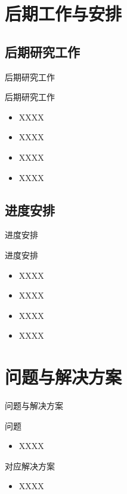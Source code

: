 \documentclass[9pt]{ctexbeamer}
\begin{document}
\section{后期工作与安排}

\subsection{后期研究工作}

\begin{frame}{后期研究工作}
  \begin{block}{后期研究工作}
    \begin{itemize}
      \setlength{\itemsep}{6pt}
      \item XXXX
      \item XXXX
      \item XXXX
      \item XXXX
    \end{itemize}
  \end{block}
\end{frame}

\subsection{进度安排}

\begin{frame}{进度安排}
  \begin{block}{进度安排}
    \begin{itemize}
      \setlength{\itemsep}{6pt}
      \item XXXX\cite{bottou2018optimization}
      \item XXXX\cite{POLYAK19641}
      \item XXXX\cite{nesterov1983method}
      \item XXXX\cite{Goodfellow-et-al-2016}
    \end{itemize}
  \end{block}
\end{frame}

\section{问题与解决方案}

\begin{frame}{问题与解决方案}
  \begin{block}{问题}
    \begin{itemize}
      \item XXXX
    \end{itemize}
  \end{block}
  \begin{block}{对应解决方案}
    \begin{itemize}
      \item XXXX
    \end{itemize}
  \end{block}
\end{frame}
\end{document}

